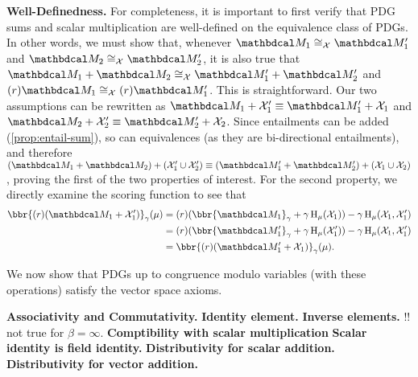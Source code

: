 \begin{subappendices}
    
    \begin{lproof}\label{proof:pdg-vecspace}
        \textbf{Well-Definedness.}
        For completeness, it is important to first verify that PDG sums and scalar multiplication are well-defined 
        on the equivalence class of PDGs.
        In other words, we must show that, whenever $\dg M_1 \cong_\X \dg M_1'$ and $\dg M_2 \cong_\X \dg M_2'$, 
        it is also true that $\dg M_1 + \dg M_2 \cong_\X \dg M_1' + \dg M_2'$ and  $(r) \dg M_1 \cong_\X (r) \dg M_1'$. 
        This is straightforward.
        Our two assumptions can be rewritten as
        $\dg M_1 + \X_1' \equiv \dg M_1' + \X_1$
        and 
        $\dg M_2 + \X_2' \equiv \dg M_2' + \X_2$. 
        Since entailments can be added (\cref{prop:entail-sum}), so can 
            equivalences (as they are bi-directional entailments), and therefore
        $(\dg M_1 + \dg M_2) + (\X_1' \cup \X_2') \equiv (\dg M_1' + \dg M_2') + (\X_1 \cup \X_2)$,
        proving the first of the two properties of interest.
        For the second property, 
        we directly examine the scoring function to see that
        \begin{align*}
            \bbr{(r) (\dg M_1 + \X_1')}_\gamma (\mu)
            &= (r) (\bbr{\dg M_1}_\gamma + \gamma \H_\mu(\X_1))  - \gamma \H_\mu(\X_1, \X_1') \\
            &= (r) (\bbr{\dg M_1'}_\gamma + \gamma \H_\mu(\X_1'))  - \gamma \H_\mu(\X_1, \X_1') \\
            &= \bbr{(r) (\dg M_1' + \X_1)}_\gamma (\mu).
        \end{align*}
        
        We now show that PDGs up to congruence modulo variables (with these operations)
        satisfy the vector space axioms. 
        
        \textbf{Associativity and Commutativity.}
        \textbf{Identity element.}
        \textbf{Inverse elements.} !! not true for $\beta = \infty$. 
        \textbf{Comptibility with scalar multiplication}
        \textbf{Scalar identity is field identity.}
        \textbf{Distributivity for scalar addition.}
        \textbf{Distributivity for vector addition.}
        

\end{lproof}
\end{subappendices}
